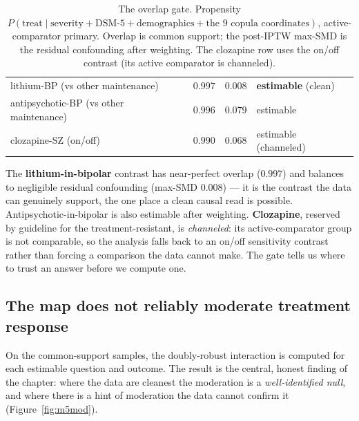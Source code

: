 \begin{table}[h]\centering\small\sffamily
\caption{The overlap gate. Propensity $P(\text{treat}\mid\text{severity}+\text{DSM-5}+\text{demographics}+\text{the
9 copula coordinates})$, active-comparator primary. Overlap is common support; the post-IPTW max-SMD is the
residual confounding after weighting. The clozapine row uses the on/off contrast (its active comparator is channeled).}
\label{tab:m5overlap}
\begin{tabular}{L{5.6cm} C{2.2cm} C{2.8cm} L{3.4cm}}
\toprule
{} &  &  & \\
\midrule
{} lithium-BP (vs other maintenance) & $0.997$ & $0.008$ & \textbf{estimable} (clean)\\
antipsychotic-BP (vs other maintenance) & $0.996$ & $0.079$ & estimable\\
 clozapine-SZ (on/off) & $0.990$ & $0.068$ & estimable (channeled)\\
\bottomrule
\end{tabular}
\end{table}

\begin{keyresult}
The \textbf{lithium-in-bipolar} contrast has near-perfect overlap ($0.997$) and balances to negligible residual
confounding (max-SMD $0.008$) --- it is the contrast the data can genuinely support, the one place a clean causal
read is possible. Antipsychotic-in-bipolar is also estimable after weighting. \textbf{Clozapine}, reserved by
guideline for the treatment-resistant, is \emph{channeled}: its active-comparator group is not comparable, so the
analysis falls back to an on/off sensitivity contrast rather than forcing a comparison the data cannot make. The
gate tells us where to trust an answer before we compute one.
\end{keyresult}

\subsection{The map does not reliably moderate treatment response}
\label{sub:m5moderation}
On the common-support samples, the doubly-robust interaction is computed for each estimable question and outcome.
The result is the central, honest finding of the chapter: where the data are cleanest the moderation is a
\emph{well-identified null}, and where there is a hint of moderation the data cannot confirm it
(Figure~\ref{fig:m5mod}).

